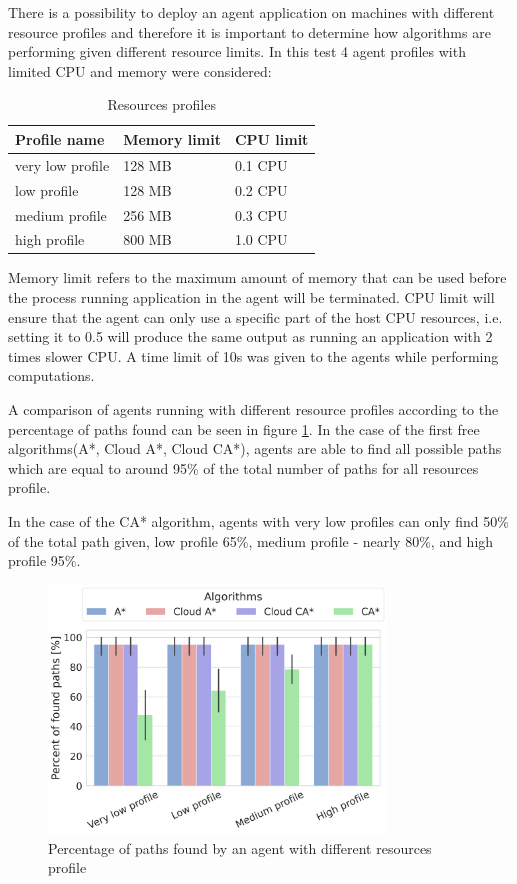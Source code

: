 There is a possibility to deploy an agent application on machines with different resource profiles and therefore it is important to determine how algorithms are performing given different resource limits.
In this test 4 agent profiles with limited CPU and memory were considered:
\begin{table}[H]
\caption{Resources profiles}
\label{tab:resorces_profile}
\centering
\begin{tabular}{@{}lll@{}}
\toprule
Profile name     & Memory limit & CPU limit \\ \midrule
very low profile & 128 MB        & 0.1 CPU   \\
low profile      & 128 MB        & 0.2 CPU   \\
medium profile   & 256 MB        & 0.3 CPU   \\
high profile     & 800 MB        & 1.0 CPU     \\ \bottomrule
\end{tabular}%
\end{table}

Memory limit refers to the maximum amount of memory that can be used before the process running application in the agent will be terminated. CPU limit will ensure that the agent can only use a specific part of the host CPU resources, i.e. setting it to 0.5 will produce the same output as running an application with 2 times slower CPU\cite{docker_container_limits}. A time limit of 10s was given to the agents while performing computations.

A comparison of agents running with different resource profiles according to the percentage of paths found can be seen in figure \ref{fig:compare_profiles_paths}. In the case of the first free algorithms(A*, Cloud A*, Cloud CA*), agents are able to find all possible paths which are equal to around 95\% of the total number of paths for all resources profile. 

In the case of the CA* algorithm, agents with very low profiles can only find 50\% of the total path given, low profile 65\%, medium profile - nearly 80\%, and high profile 95\%. 
\begin{figure}[H]
    \centering
    \includegraphics[width=0.8\textwidth]{pictures/compare_profiles_paths.png}
    \caption{Percentage of paths found by an agent with different resources profile
    }
    \label{fig:compare_profiles_paths}
\end{figure}

